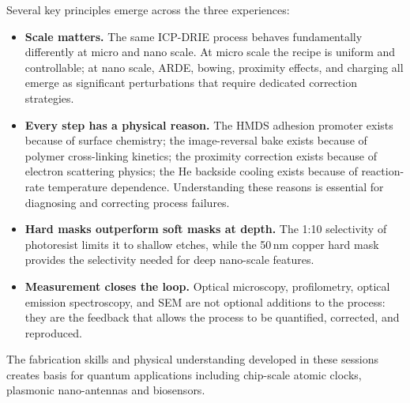 Several key principles emerge across the three experiences:

\begin{itemize}
  \item \textbf{Scale matters.} The same ICP-DRIE process behaves
    fundamentally differently at micro and nano scale. At micro scale
    the recipe is uniform and controllable; at nano scale, ARDE,
    bowing, proximity effects, and charging all emerge as significant
    perturbations that require dedicated correction strategies.

  \item \textbf{Every step has a physical reason.} The HMDS adhesion
    promoter exists because of surface chemistry; the image-reversal
    bake exists because of polymer cross-linking kinetics; the
    proximity correction exists because of electron scattering
    physics; the He backside cooling exists because of reaction-rate
    temperature dependence. Understanding these reasons is essential
    for diagnosing and correcting process failures.

  \item \textbf{Hard masks outperform soft masks at depth.} The 1:10
    selectivity of photoresist limits it to shallow etches, while the
    50\,nm copper hard mask provides the selectivity needed for deep
    nano-scale features.

  \item \textbf{Measurement closes the loop.} Optical microscopy,
    profilometry, optical emission spectroscopy, and SEM are not
    optional additions to the process: they are the feedback that
    allows the process to be quantified, corrected, and reproduced.
\end{itemize}
The fabrication skills and physical understanding developed in these sessions creates basis for quantum applications including chip-scale atomic clocks, plasmonic nano-antennas and biosensors.